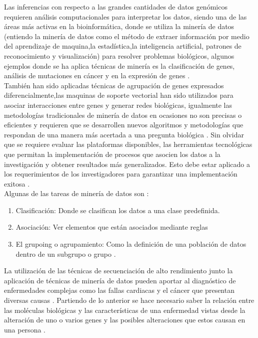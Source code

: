 Las inferencias con respecto a las grandes cantidades de datos genómicos requieren análisis computacionales para interpretar los datos, siendo una de las áreas más activas en la bioinformática, donde se utiliza la minería de datos (entiendo la minería de datos como el método de extraer información por medio del aprendizaje de maquina,la estadística,la inteligencia artificial, patrones de reconocimiento y visualización) para resolver problemas biológicos, algunos ejemplos donde se ha aplica técnicas de minería es la clasificación de genes, análisis de mutaciones en cáncer y en la expresión de genes \cite{Littlefield}. \\

También han sido aplicadas técnicas de agrupación de genes expresados diferencialmente,las maquinas de soporte vectorial han sido utilizados para asociar interacciones entre genes y generar redes biológicas, igualmente las metodologías tradicionales de minería de datos en ocasiones no son precisas o eficientes y requieren que se desarrollen nuevos algoritmos y metodologías que respondan de una manera más acertada a una pregunta biológica \cite{Zaki2007}. Sin olvidar que se requiere evaluar las plataformas disponibles, las herramientas tecnológicas que permitan  la implementación de procesos que asocien los datos a  la investigación  y obtener resultados más generalizados.  Esto debe estar aplicado a los requerimientos de los investigadores para garantizar una implementación exitosa \cite{Bustos2007,Zaki2007}.\\

Algunas de las tareas de minería de datos son \cite{Littlefield}:

\begin{enumerate}[1.]
	\item Clasificación: Donde se clasifican los datos a una clase predefinida.
	\item Asociación: Ver elementos que están asociados mediante reglas
	\item El grupoing o agrupamiento: Como la definición de una población de datos dentro de un subgrupo o grupo .
\end{enumerate}

La utilización de las técnicas de secuenciación de alto rendimiento junto  la aplicación de técnicas de minería de datos pueden aportar al diagnóstico de enfermedades complejas  como las fallas cardiacas y el cáncer que presentan diversas causas \cite{Hannah-Shmouni2015} . Partiendo de lo anterior se hace necesario saber la relación entre las moléculas biológicas y las características de una enfermedad vistas desde la alteración de uno o varios genes y las posibles alteraciones que estos causan en una persona \cite{Li2014}.

